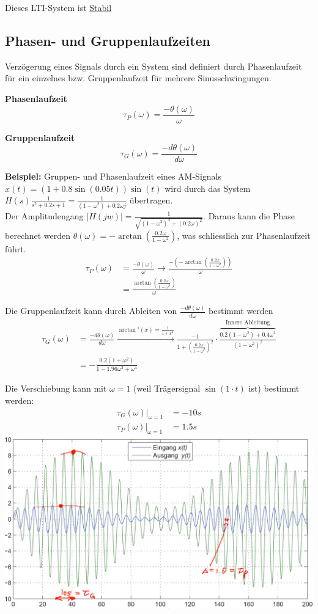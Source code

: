 Dieses LTI-System ist \underline{Stabil}

\subsection{Phasen- und Gruppenlaufzeiten}
Verzögerung eines Signals durch ein System sind definiert durch Phasenlaufzeit für ein einzelnes bzw. Gruppenlaufzeit für mehrere Sinusschwingungen.

\noindent\textbf{Phasenlaufzeit}
\[
\tau_P(\omega) = \frac{-\theta(\omega)}{\omega}
\]

\noindent\textbf{Gruppenlaufzeit}
\[
\tau_G(\omega) = \frac{-d\theta(\omega)}{d\omega}
\]

\textbf{Beispiel:} Gruppen- und Phasenlaufzeit eines AM-Signals $x(t) = (1+0.8\sin(0.05t))\sin(t)$ wird durch das System $H(s) \frac{1}{s^2 + 0.2s + 1} = \frac{1}{(1 -\omega^2) + 0.2\omega j}$ übertragen.\\
Der Amplitudengang $|H(jw)| = \frac{1}{\sqrt{(1-\omega^2)^2 + (0.2\omega)^2}}$. Daraus kann die Phase berechnet werden $\theta(\omega) = -\arctan\left(\frac{0.2\omega}{1-\omega^2}\right)$, was schliesslich zur Phasenlaufzeit führt.
\begin{align*}
	\tau_P(\omega) &= \frac{-\theta(\omega)}{\omega} \rightarrow \frac{-(-\arctan\left(\frac{0.2\omega}{1-\omega^2}\right))}{\omega} \\
	&= \frac{\arctan\left(\frac{0.2\omega}{1-\omega^2}\right)}{\omega} 
\end{align*}

Die Gruppenlaufzeit kann durch Ableiten von $\frac{-d\theta(\omega)}{d\omega}$ bestimmt werden
\begin{align*}
	\tau_G(\omega) &= \frac{-d\theta(\omega)}{d\omega} \xrightarrow{\arctan'(x) = \frac{1}{1+x^2}} \frac{-1}{1 + \left(\frac{0.2\omega}{1 - \omega^2}\right)^2} \cdot \overbrace{\frac{0.2(1-\omega^2) + 0.4\omega^2}{(1 - \omega^2)^2}}^\text{Innere Ableitung} \\
	&= -\frac{0.2(1+\omega^2)}{1-1.96\omega^2 + \omega^4}
\end{align*}


Die Verschiebung kann mit $\omega = 1$ (weil Trägersignal $\sin(1\cdot t)$ ist) bestimmt werden:
\begin{align*}
	\left.\tau_G(\omega)\right|_{\omega = 1} &= -10s \\
	\left.\tau_P(\omega)\right|_{\omega = 1} &= 1.5s 
\end{align*}
\includegraphics[width=\columnwidth]{Images/gruppenlaufzeit}


